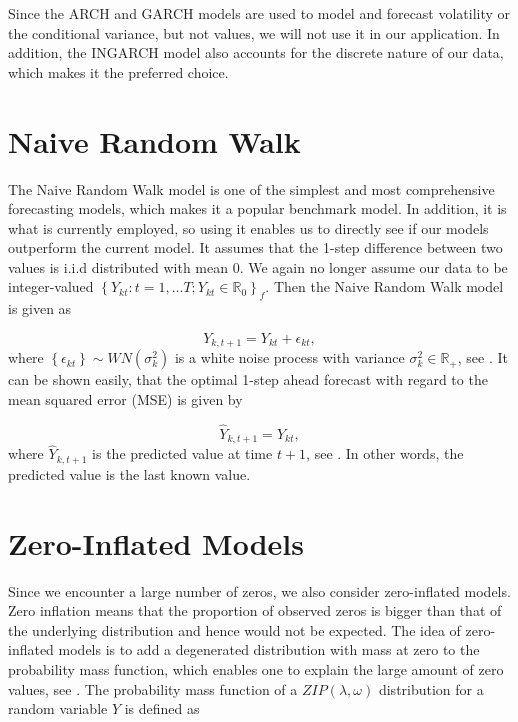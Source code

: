 Since the ARCH and GARCH models are used to model and forecast volatility or the conditional variance, but not values, we will not use it in our application. In addition, the INGARCH model also accounts for the discrete nature of our data, which makes it the preferred choice. 


\section{Naive Random Walk}
\label{sec: Naive Random Walk}

The Naive Random Walk model is one of the simplest and most comprehensive forecasting models, which makes it a popular benchmark model. In addition, it is what is currently employed, so using it enables us to directly see if our models outperform the current model. It assumes that the 1-step difference between two values is i.i.d distributed with mean 0. We again no longer assume our data to be integer-valued $\left\{Y_{kt}:t=1,\ldots T; Y_{kt} \in \mathbb{R}_0\right\}_f$. Then the Naive Random Walk model is given as

\begin{equation}
Y_{k,t+1}= Y_{kt} + \epsilon_{kt}, 
\label{eq: Random Walk Model}
\end{equation}
where $\left\{\epsilon_{kt}\right\} \sim WN(\sigma_k^2)$ is a white noise process with variance $\sigma_k^2 \in \mathbb{R}_+$, see \textcite{Nau:14}. It can be shown easily, that the optimal 1-step ahead forecast with regard to the mean squared error (MSE) is given by

\begin{equation}
\hat{Y}_{k,t+1}= Y_{kt},
\label{eq: Random Walk Model Prediction}
\end{equation}
%
where $\hat{Y}_{k,t+1}$ is the predicted value at time $t+1$, see \textcite{Scherrer:2021}. In other words, the predicted value is the last known value.  


\section{Zero-Inflated Models}
\label{sec: Zim}

Since we encounter a large number of zeros, we also consider zero-inflated models. Zero inflation means that the proportion of observed zeros is bigger than that of the underlying distribution and hence would not be expected. The idea of zero-inflated models is to add a degenerated distribution with mass at zero to the probability mass function, which enables one to explain the large amount of zero values, see \textcite{Zhu:2012}. The probability mass function of a $ZIP(\lambda,\omega)$ distribution for a random variable $Y$ is defined as

